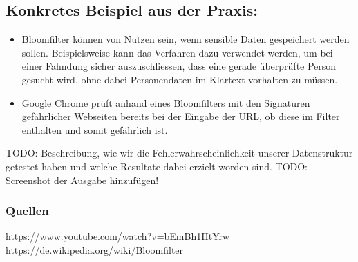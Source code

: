 \documentclass[10 pt]{scrartcl}
\begin{document}
\subsection{Konkretes Beispiel aus der Praxis: }
\begin{itemize}
    \item{Bloomfilter können von Nutzen sein, wenn sensible Daten gespeichert werden sollen. Beispielsweise kann das Verfahren dazu verwendet werden, um bei einer Fahndung sicher auszuschliessen, dass eine gerade überprüfte Person gesucht wird, ohne dabei Personendaten im Klartext vorhalten zu müssen.}
    \item{Google Chrome prüft anhand eines Bloomfilters mit den Signaturen gefährlicher Webseiten bereits bei der Eingabe der URL, ob diese im Filter enthalten und somit gefährlich ist.}
\end{itemize}
TODO: Beschreibung, wie wir die Fehlerwahrscheinlichkeit unserer Datenstruktur getestet haben und welche Resultate dabei erzielt worden sind.
TODO: Screenshot der Ausgabe hinzufügen!
\subsubsection[]{Quellen}
https://www.youtube.com/watch?v=bEmBh1HtYrw
\linebreak https://de.wikipedia.org/wiki/Bloomfilter
\end{document}
